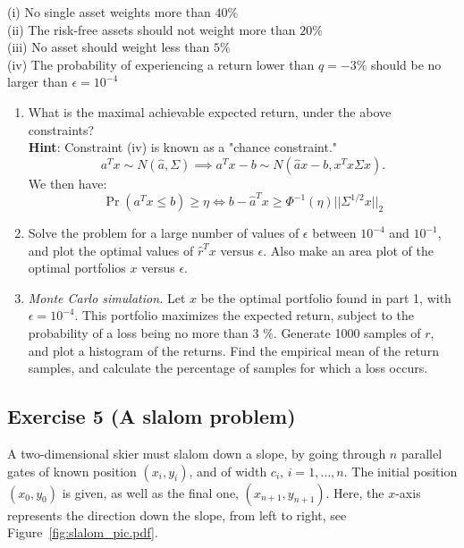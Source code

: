 \documentclass[11pt]{article}
\begin{document}
(i) No single asset weights more than $40\%$ \\ 
(ii) The risk-free assets should not weight more than $20\%$ \\ 
(iii) No asset should weight less than $5\%$ \\ 
(iv) The probability of experiencing a return lower than $q = -3\%$ should be no larger than $\epsilon = 10^{-4}$ 
\begin{enumerate}
\item 
What is the maximal achievable expected return, under the above constraints? \\

\textbf{Hint}: Constraint (iv) is known as a "chance constraint." 
\[
a^Tx \sim N(\hat{a}, \Sigma) \implies a^Tx - b \sim N(\hat{a}x - b, x^Tx\Sigma x).
\]
We then have:
\[\Pr(a^Tx \leq b) \geq \eta \iff b - \hat{a}^Tx \geq \Phi^{-1}(\eta)||\Sigma^{1/2}x||_2
\]

\item Solve the problem for a large number of values of $\epsilon$ between $10^{-4}$ and $10^{-1}$, and plot the optimal values of $\hat{r}^Tx$ versus $\epsilon$. Also make an area plot of the optimal portfolios $x$ versus $\epsilon$. 

\item \textit{Monte Carlo simulation.} Let $x$ be the optimal portfolio found in part 1, with $\epsilon=10^{-4}$. This portfolio maximizes the expected return, subject to the probability of a loss being no more than 3 $\%$. Generate 1000 samples of $r$, and plot a histogram of the returns. Find the empirical mean of the return samples, and calculate the percentage of samples for which a loss occurs.

\end{enumerate}

\begin{solution}
\end{solution}

\newpage
\subsection*{Exercise 5 (A slalom problem)}

A two-dimensional skier must slalom down a slope, by going through $n$ parallel gates of known position $(x_i,y_i)$, and of width $c_i$, $i=1,\ldots,n$. The initial position $(x_0,y_0)$ is given, as well as the final one, $(x_{n+1},y_{n+1})$. Here, the $x$-axis represents the direction down the slope, from left to right, see Figure~\ref{fig:slalom_pic.pdf}. \\ 
\end{document}
